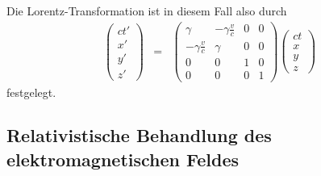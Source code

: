 \documentclass{book}
\begin{document}
%
Die Lorentz-Transformation ist in diesem Fall also durch
%
\begin{eqnarray}
\left(\begin{array}{c}
ct'\\
x'\\
y'\\
z'
\end{array}\right) & = & \left(\begin{array}{cccc}
\gamma& -\gamma\frac{v}{c}&0&0\\
- \gamma\frac{v}{c}&\gamma&0&0\\
0&0&1&0\\
0&0&0&1
\end{array}\right)\left(\begin{array}{c}
ct\\
x\\
y\\
z
\end{array}\right)\label{eq:lorentztrafo_spec}
\end{eqnarray}
%
festgelegt.

\subsection{Relativistische Behandlung des elektromagnetischen Feldes}
\label{sec:relativistische_behandlung_des_elektromagnetischen_feldes}
\end{document}
